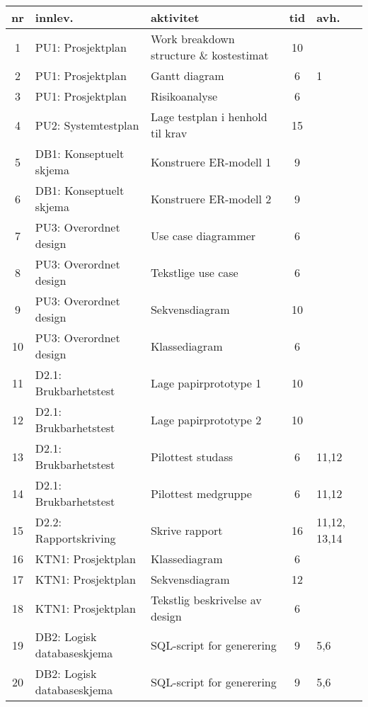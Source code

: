 
\small
\begin{longtable}[l]{|c|l|l|c|p{0.7cm}|}

	\hline
	\textbf{nr}& \textbf{innlev.}& \textbf{aktivitet}& \textbf{tid}& \textbf{avh.}\\ \hline
	1 & PU1: Prosjektplan & Work breakdown structure \& kostestimat & 10 & \\ \hline
	2 & PU1: Prosjektplan  & Gantt diagram & 6 & 1 \\ \hline
	3 & PU1: Prosjektplan  & Risikoanalyse & 6 & \\ \hline
	4 & PU2: Systemtestplan & Lage testplan i henhold til krav & 15 & \\ \hline
	5 & DB1: Konseptuelt skjema & Konstruere ER-modell 1 & 9 & \\ \hline
	6 & DB1: Konseptuelt skjema & Konstruere ER-modell 2 & 9 & \\ \hline
	7 & PU3: Overordnet design & Use case diagrammer & 6 & \\ \hline
	8 & PU3: Overordnet design  & Tekstlige use case & 6 & \\ \hline
	9 & PU3: Overordnet design  & Sekvensdiagram & 10 & \\ \hline
	10 & PU3: Overordnet design  & Klassediagram & 6 & \\ \hline
	11 & D2.1: Brukbarhetstest & Lage papirprototype 1& 10 & \\ \hline
	12 & D2.1: Brukbarhetstest & Lage papirprototype 2& 10 & \\ \hline
	13 & D2.1: Brukbarhetstest & Pilottest studass & 6 & 11,12\\ \hline
	14 & D2.1: Brukbarhetstest & Pilottest medgruppe & 6 & 11,12\\ \hline
	15 & D2.2: Rapportskriving & Skrive rapport & 16 & 11,12, 13,14 \\ \hline
	16 & KTN1: Prosjektplan & Klassediagram & 6 & \\ \hline
	17 & KTN1: Prosjektplan & Sekvensdiagram & 12 & \\ \hline
	18 & KTN1: Prosjektplan & Tekstlig beskrivelse av design & 6 & \\ \hline
	19 & DB2: Logisk databaseskjema & SQL-script for generering & 9 & 5,6 \\ \hline
	20 & DB2: Logisk databaseskjema & SQL-script for generering & 9 & 5,6 \\ \hline

\end{longtable}
